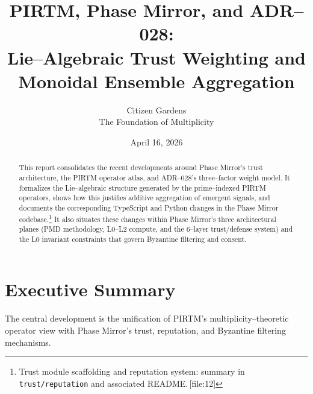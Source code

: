 \documentclass[11pt]{article}
\title{PIRTM, Phase Mirror, and ADR--028:\\
Lie--Algebraic Trust Weighting and Monoidal Ensemble Aggregation}
\author{Citizen Gardens \\ The Foundation of Multiplicity}
\date{April 16, 2026}
\begin{document}
\maketitle

\begin{abstract}
This report consolidates the recent developments around Phase Mirror's trust
architecture, the PIRTM operator atlas, and ADR--028's three--factor weight
model. It formalizes the Lie--algebraic structure generated by the prime--indexed
PIRTM operators, shows how this justifies additive aggregation of emergent
signals, and documents the corresponding TypeScript and Python changes in the
Phase Mirror codebase.\footnote{Trust module scaffolding and reputation system:
summary in \texttt{trust/reputation} and associated README.\,[file:12]}
It also situates these changes within Phase Mirror's three architectural planes
(PMD methodology, L0--L2 compute, and the 6--layer trust/defense system) and the
L0 invariant constraints that govern Byzantine filtering and consent.
\end{abstract}

\newpage
\tableofcontents

\section{Executive Summary}

The central development is the unification of PIRTM's multiplicity--theoretic
operator view with Phase Mirror's trust, reputation, and Byzantine filtering
mechanisms.
\end{document}
